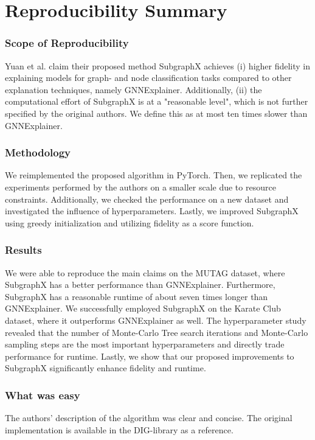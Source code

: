 \section*{\centering Reproducibility Summary}

\subsubsection*{Scope of Reproducibility}
Yuan et al. claim their proposed method SubgraphX achieves (i) higher fidelity in explaining models for graph- and node classification tasks compared to other explanation techniques, namely GNNExplainer. 
Additionally, (ii) the computational effort of SubgraphX is at a "reasonable level", which is not further specified by the original authors. We define this as at most ten times slower than GNNExplainer.

\subsubsection*{Methodology}
We reimplemented the proposed algorithm in PyTorch. 
Then, we replicated the experiments performed by the authors on a smaller scale due to resource constraints. 
Additionally, we checked the performance on a new dataset and investigated the influence of hyperparameters.
Lastly, we improved SubgraphX using greedy initialization and utilizing fidelity as a score function.

\subsubsection*{Results}
We were able to reproduce the main claims on the MUTAG dataset, where SubgraphX has a better performance than GNNExplainer.
Furthermore, SubgraphX has a reasonable runtime of about seven times longer than GNNExplainer. 
We successfully employed SubgraphX on the Karate Club dataset, where it outperforms GNNExplainer as well.
The hyperparameter study revealed that the number of Monte-Carlo Tree search iterations and Monte-Carlo sampling steps are the most important hyperparameters and directly trade performance for runtime.
Lastly, we show that our proposed improvements to SubgraphX significantly enhance fidelity and runtime.

\subsubsection*{What was easy}
The authors' description of the algorithm was clear and concise. The original implementation is available in the DIG-library as a reference.

